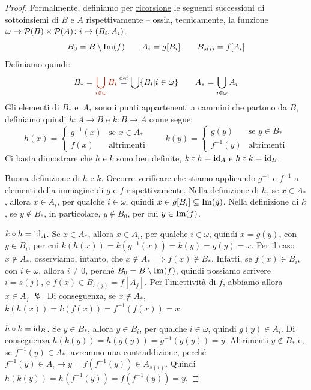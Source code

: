 \begin{proof}
	Formalmente, definiamo per \hyperref[ric1]{ricorsione} le seguenti
successioni di sottoinsiemi di $B$ e $A$ rispettivamente -- ossia,
tecnicamente, la funzione $\omega \to \mathcal{P}(B) \times \mathcal{P}(A) \colon i
\mapsto (B_i,A_i)$.
	\[ B_0 = B \setminus\operatorname{Im}(f) \qquad A_i = g[B_i] \qquad B_{s(i)} = f[A_i]
		\]
	Definiamo quindi:
	\[ B_* = {\drkred \bigcup_{i \in \omega}B_i} \Mydef \bigcup\{B_i | i \in \omega\} \qquad A_* = \bigcup_{i \in \omega} A_i
		\]
	Gli elementi di $B_*$ e~$A_*$ sono i punti appartenenti a cammini
che partono da $B$, definiamo quindi $h\colon A \to B$ e $k\colon B \to A$ come segue:
	\[ h(x) = \begin{cases}
		g^{-1}(x) &\text{se $x \in A_*$}\\
		f(x) &\text{altrimenti}
	\end{cases}
	\qquad
	k(y) = \begin{cases}
		g(y) &\text{se $y \in B_*$}\\
		f^{-1}(y) &\text{altrimenti}
	\end{cases}
		\]
	Ci basta dimostrare che $h$ e $k$ sono ben definite, $k \circ h = \operatorname{id}_A$ e $h \circ k = \operatorname{id}_B$.

{\drkblu Buona definizione di $h$ e $k$.} Occorre verificare che stiamo applicando $g^{-1}$ e $f^{-1}$ a elementi della immagine di $g$ e $f$ rispettivamente.
		Nella definizione di $h$, se $x \in A_*$, allora $x \in A_i$, per qualche $i \in \omega$, quindi $x \in g[B_i] \subseteq \operatorname{Im}(g)$. Nella definizione di $k$, se $y \not \in B_*$, in particolare,
		$y \not \in B_0$, per cui $y \in \operatorname{Im}(f)$.

{\drkblu $k \circ h = \operatorname{id}_A$.} Se $x \in A_*$, allora $x \in A_i$, per qualche $i \in \omega$, quindi $x = g(y)$, con $y \in B_i$, per cui $k(h(x)) = k(g^{-1}(x)) = k(y) = g(y) = x$.
		Per il caso $x \not \in A_*$, osserviamo, intanto, che $x \not \in A_* \implies f(x) \not \in B_*$. Infatti, se $f(x) \in B_i$, con $i \in \omega$, allora $i \ne 0$, perch\'e $B_0 = B \setminus \operatorname{Im}(f)$, quindi possiamo scrivere $i = s(j)$, 
		e $f(x) \in B_{s(j)} = f[A_j]$. Per l'iniettivit\`a di
$f$, abbiamo allora $x \in A_j \;\lightning\,$
		Di conseguenza, se $x \not \in A_*$, $k(h(x)) = k(f(x)) = f^{-1}(f(x)) = x$.

{\drkblu $h \circ k = \operatorname{id}_B$.} Se $y \in B_*$, allora $y \in B_i$, per qualche $i \in \omega$, quindi $g(y) \in A_i$. Di conseguenza $h(k(y)) = h(g(y)) = g^{-1}(g(y)) = y$. Altrimenti $y \not \in B_*$ e, se $f^{-1}(y)\in A_*$, avremmo una contraddizione,
		perch\'e $f^{-1}(y) \in A_i \rightarrow y = f(f^{-1}(y)) \in A_{s(i)}$. Quindi $h(k(y)) = h(f^{-1}(y)) = f(f^{-1}(y)) = y$.
\end{proof}

